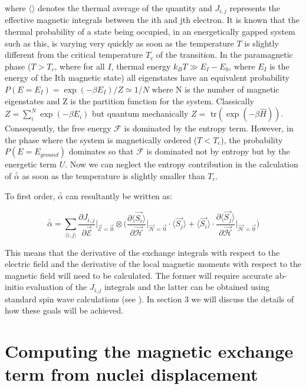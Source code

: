 \documentclass[10pt]{article}
\begin{document}
where $\langle \rangle$ denotes the thermal average of the quantity and $J_{i,j}$ represents the effective magnetic integrals between the ith and jth electron. It is known that the thermal probability of a state being occupied, in an energetically gapped system such as this, is varying very quickly as soon as the temperature $T$ is slightly different from the critical temperature $T_c$ of the transition. In the paramagnetic phase ($T > T_c$, where for all $I$, thermal energy $k_B T \gg E_I - E_0$, where $E_I$ is the energy of the Ith magnetic state) all eigenstates have an equivalent probability $P(E = E_I) = \exp(-\beta E_I)/Z \simeq 1/N$ where N is the number of magnetic eigenstates and Z is the partition function for the system. Classically $Z = \sum_{i}^{N} \exp(-\beta E_i)$ but quantum mechanically $Z =$ tr$(\exp(-\beta \hat{H}))$. Consequently, the free energy $\mathcal{F}$ is dominated by the entropy term. However, in the phase where the system is magnetically ordered ($T < T_c$), the probability $P(E = E_{ground})$ dominates so that $\mathcal{F}$ is dominated not by entropy but by the energetic term $U$. Now we can neglect the entropy contribution in the calculation of $\bar{\bar{\alpha}}$ as soon as the temperature is slightly smaller than $T_c$.

To first order, $\bar{\bar{\alpha}}$ can resultantly be written as:

\begin{equation}
	\bar{\bar{\alpha}} = \sum_{\langle i,j \rangle} \frac{\partial J_{i,j}}{\partial \vec{\mathcal{E}}}\biggr\vert_{\vec{\mathcal{E}}=\vec{0}}\otimes\biggr(\frac{\partial \langle \vec{S_i}\rangle}{\partial \vec{\mathcal{H}}}\biggr\vert_{\vec{\mathcal{H}} = \vec{0}}\cdot\langle\vec{S_j}\rangle + \langle\vec{S_i}\rangle\cdot\frac{\partial \langle \vec{S_j}\rangle}{\partial\vec{\mathcal{H}}}\biggr\vert_{\vec{\mathcal{H}}=\vec{0}}\biggr)
\end{equation}

This means that the derivative of the exchange integrals with respect to the electric field and the derivative of the local magnetic moments with respect to the magnetic field will need to be calculated. The former will require accurate ab-initio evaluation of the $J_{i,j}$ integrals and the latter can be obtained using standard spin wave calculations (see \cite{anderson1951limits,kubo1952spin,oguchi1960theory}). In section 3 we will discuss the details of how these goals will be achieved.

\section{Computing the magnetic exchange term from nuclei displacement}
\end{document}
